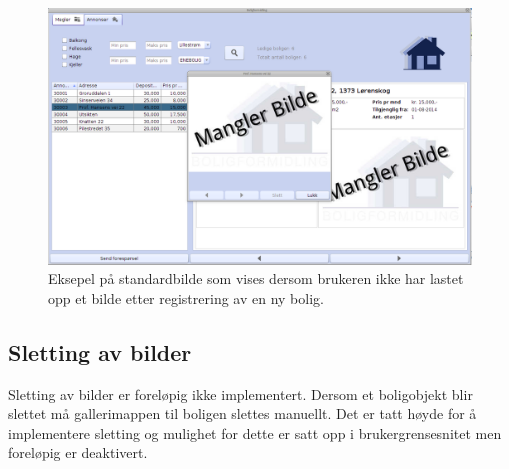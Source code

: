 \begin{figure}[ht!]
 \includegraphics[width=\textwidth,height=\textheight,keepaspectratio]{./img/produktdokumentasjon/bilder/4.png}
 \caption[Standardbilde]{Eksepel på standardbilde som vises dersom brukeren ikke har lastet opp et bilde etter registrering av en ny bolig.}
 \label{fig:manglerbilde}
\end{figure}

\subsection{Sletting av bilder}
Sletting av bilder er foreløpig ikke implementert. Dersom et boligobjekt blir slettet må gallerimappen til boligen slettes manuellt. Det er tatt høyde for å implementere sletting og mulighet for dette er satt opp i brukergrensesnitet men foreløpig er deaktivert. 